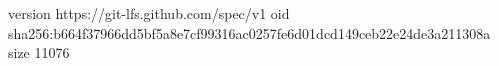 version https://git-lfs.github.com/spec/v1
oid sha256:b664f37966dd5bf5a8e7cf99316ac0257fe6d01dcd149ceb22e24de3a211308a
size 11076
